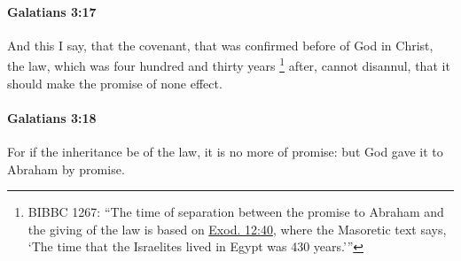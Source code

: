 		\paragraph{Galatians 3:17} %
			\label{GALATIANS-3-17}

			And this I say, that the covenant, that was confirmed before of God in Christ, the law, which was four hundred and thirty years%
				\footnote{%
					BIBBC 1267: ``The time of separation between the promise to Abraham and the giving of the law is based on \hyperref[EXODUS-12-40]{Exod. 12:40}, where the Masoretic text says, `The time that the Israelites lived in Egypt was 430 years.'''
					}
			after, cannot disannul, that it should make the promise of none effect.

			\begin{framed}
			\scriptsize
				\begin{compactdesc}
					\item[SBLG] 
				\end{compactdesc}
			\end{framed}

		\paragraph{Galatians 3:18} %
			\label{GALATIANS-3-18}

			For if the inheritance be of the law, it is no more of promise: but God gave it to Abraham by promise.

